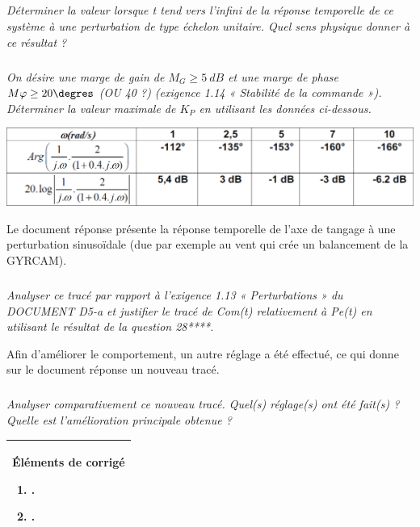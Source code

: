 \documentclass[10pt,fleqn]{article} %
\newif\ifcolle
\begin{document}
\begin{multicols}{2}
\subparagraph{}
\textit{Déterminer la valeur lorsque t tend vers l’infini de la réponse temporelle de ce système à une
perturbation de type échelon unitaire. Quel sens physique donner à ce résultat ?}
\ifprof
\begin{corrige}
\end{corrige}
\else
\fi

\subparagraph{}
\textit{On désire une marge de gain de $M_G \geq \SI{5}{dB}$ et une marge de phase $M\varphi \geq 20\degres$ (OU 40 ?) (exigence 1.14 « Stabilité de la commande »). Déterminer la valeur maximale de $K_P$ en utilisant les données ci-dessous.}
\begin{center}
\includegraphics[width=\linewidth]{images/fig_04}
\end{center}
\ifprof
\begin{corrige}
\end{corrige}
\else
\fi

Le document réponse présente la réponse temporelle de l’axe de tangage à une perturbation sinusoïdale (due par
exemple au vent qui crée un balancement de la GYRCAM).

\subparagraph{}
\textit{Analyser ce tracé par rapport à l’exigence 1.13 « Perturbations » du DOCUMENT D5-a et justifier le
tracé de Com(t) relativement à Pe(t) en utilisant le résultat de la question 28****.}
\ifprof
\begin{corrige}
\end{corrige}
\else
\fi

Afin d’améliorer le comportement, un autre réglage a été effectué, ce qui donne sur le document réponse un nouveau
tracé.

\subparagraph{}
\textit{Analyser comparativement ce nouveau tracé. Quel(s) réglage(s) ont été fait(s) ? Quelle est
l’amélioration principale obtenue ?}
\ifprof
\begin{corrige}
\end{corrige}
\else
\fi



\ifcolle
\else
\vspace{.5cm}
\begin{tabular}{|p{.95\linewidth}|}
\hline
Éléments de corrigé
\begin{enumerate}
\item .
\item .
\end{enumerate}\\
\hline
\end{tabular}
\fi

\ifprof
\else
\end{multicols}
\fi
\end{document}
